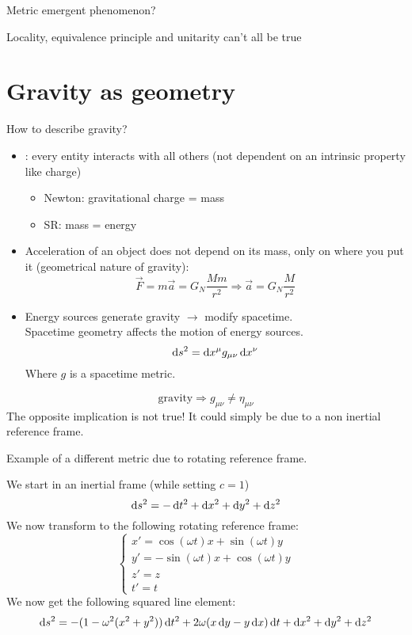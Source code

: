 Metric emergent phenomenon?


Locality, equivalence principle and unitarity can't all be true
















\chapter{Gravity as geometry}



How to describe gravity?
\begin{itemize}
\item {}: every entity interacts with all others (not dependent on an intrinsic property like charge)
\begin{itemize}
\item Newton: gravitational charge = mass
\item SR: mass = energy
\end{itemize}
\item Acceleration of an object does not depend on its mass, only on where you put it (geometrical nature of gravity):
\[ \vec{F} = m\vec{a} = G_N \frac{Mm}{r^2} \Rightarrow \vec{a} = G_N \frac{M}{r^2}\]
\item Energy sources generate gravity $\rightarrow$ modify spacetime.\\
Spacetime geometry affects the motion of energy sources.
\[ \operatorname{d \!}{s}^2 = \operatorname{d \!}{x}^\mu g_{\mu\nu}\operatorname{d \!}{x}^\nu \]
Where $g$ is a spacetime metric. 
\end{itemize}
\vspace{.5em}
\begin{eigenschap}
\vspace{-2em}
\[ \text{gravity} \Rightarrow g_{\mu\nu} \neq \eta_{\mu\nu} \]
The opposite implication is not true! It could simply be due to a non inertial reference frame.
\end{eigenschap}

\begin{example}
Example of a different metric due to rotating reference frame.

We start in an inertial frame (while setting $c=1$)
\[ \operatorname{d \!}{s}^2 = - \operatorname{d \!}{t}^2 + \operatorname{d \!}{x}^2 + \operatorname{d \!}{y}^2 + \operatorname{d \!}{z}^2 \]
We now transform to the following rotating reference frame:
\[ \begin{cases}
x'= \cos(\omega t) x + \sin(\omega t) y \\
y'= -\sin(\omega t) x + \cos(\omega t) y \\
z'= z \\
t'= t
\end{cases} \]
We now get the following squared line element:
\[ \diff{s}^2 = -(1-\omega^2(x^2+y^2)) \diff{t}^2 + 2\omega (x \diff{y} - y \diff{x})\diff{t}+ \diff{x}^2 + \diff{y}^2 + \diff{z}^2 \]
\end{example}

